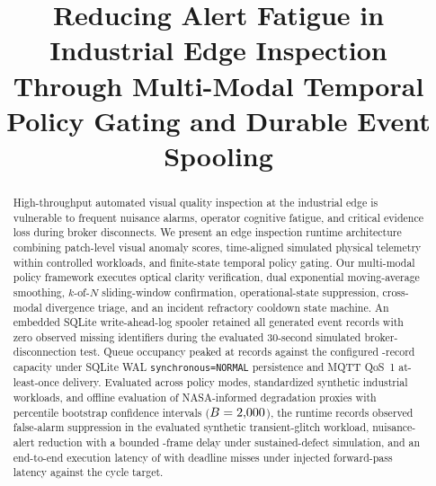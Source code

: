 \documentclass[conference]{IEEEtran}
\begin{document}
\title{Reducing Alert Fatigue in Industrial Edge Inspection Through Multi-Modal Temporal Policy Gating and Durable Event Spooling}

\author{
}

\maketitle

\begin{abstract}
High-throughput automated visual quality inspection at the industrial edge is vulnerable to frequent nuisance alarms, operator cognitive fatigue, and critical evidence loss during broker disconnects. We present an edge inspection runtime architecture combining patch-level visual anomaly scores, time-aligned simulated physical telemetry within controlled workloads, and finite-state temporal policy gating. Our multi-modal policy framework executes optical clarity verification, dual exponential moving-average smoothing, $k$-of-$N$ sliding-window confirmation, operational-state suppression, cross-modal divergence triage, and an incident refractory cooldown state machine. An embedded SQLite write-ahead-log spooler retained all \SpoolStressGeneratedEvents{} generated event records with zero observed missing identifiers during the evaluated 30-second simulated broker-disconnection test. Queue occupancy peaked at \SpoolStressPeakQueueDepth{} records against the configured \SpoolBufferCapacity{}-record capacity under SQLite WAL \texttt{synchronous=NORMAL} persistence and MQTT QoS~1 at-least-once delivery. Evaluated across \TotalPolicyModes{} policy modes, \TotalWorkloadScenarios{} standardized synthetic industrial workloads, and offline evaluation of NASA-informed degradation proxies with percentile bootstrap confidence intervals ($B = 2{,}000{}$), the runtime records observed \GlitchSuppressionFull{} false-alarm suppression in the evaluated synthetic transient-glitch workload, \SustainedSuppressionFull{} nuisance-alert reduction with a bounded \SustainedMedianDelay{}-frame delay under sustained-defect simulation, and an end-to-end execution latency of \MeanPipelineLatency{} with \DeadlineMissRate{} deadline misses under injected forward-pass latency against the \TargetDeadlineMs{} cycle target.
\end{abstract}
\end{document}
